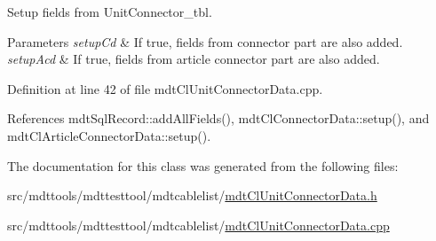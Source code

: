 Setup fields from Unit\-Connector\-\_\-tbl. 


\begin{DoxyParams}{Parameters}
{\em setup\-Cd} & If true, fields from connector part are also added. \\
\hline
{\em setup\-Acd} & If true, fields from article connector part are also added. \\
\hline
\end{DoxyParams}


Definition at line 42 of file mdt\-Cl\-Unit\-Connector\-Data.\-cpp.



References mdt\-Sql\-Record\-::add\-All\-Fields(), mdt\-Cl\-Connector\-Data\-::setup(), and mdt\-Cl\-Article\-Connector\-Data\-::setup().



The documentation for this class was generated from the following files\-:\begin{DoxyCompactItemize}
\item 
src/mdttools/mdttesttool/mdtcablelist/\hyperlink{mdt_cl_unit_connector_data_8h}{mdt\-Cl\-Unit\-Connector\-Data.\-h}\item 
src/mdttools/mdttesttool/mdtcablelist/\hyperlink{mdt_cl_unit_connector_data_8cpp}{mdt\-Cl\-Unit\-Connector\-Data.\-cpp}\end{DoxyCompactItemize}
